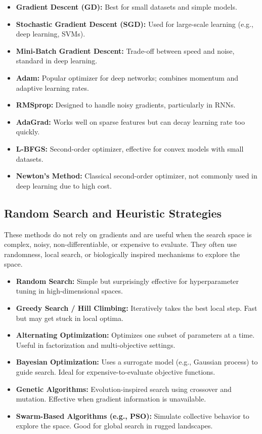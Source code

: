 \documentclass[12pt,openany]{book}
\begin{document}
\begin{itemize}
    \item \textbf{Gradient Descent (GD):} Best for small datasets and simple models.
    \item \textbf{Stochastic Gradient Descent (SGD):} Used for large-scale learning (e.g., deep learning, SVMs).
    \item \textbf{Mini-Batch Gradient Descent:} Trade-off between speed and noise, standard in deep learning.
    \item \textbf{Adam:} Popular optimizer for deep networks; combines momentum and adaptive learning rates.
    \item \textbf{RMSprop:} Designed to handle noisy gradients, particularly in RNNs.
    \item \textbf{AdaGrad:} Works well on sparse features but can decay learning rate too quickly.
    \item \textbf{L-BFGS:} Second-order optimizer, effective for convex models with small datasets.
    \item \textbf{Newton’s Method:} Classical second-order optimizer, not commonly used in deep learning due to high cost.
\end{itemize}

\subsection{Random Search and Heuristic Strategies}

These methods do not rely on gradients and are useful when the search space is complex, noisy, non-differentiable, or expensive to evaluate. They often use randomness, local search, or biologically inspired mechanisms to explore the space.

\begin{itemize}
    \item \textbf{Random Search:} Simple but surprisingly effective for hyperparameter tuning in high-dimensional spaces.
    \item \textbf{Greedy Search / Hill Climbing:} Iteratively takes the best local step. Fast but may get stuck in local optima.
    \item \textbf{Alternating Optimization:} Optimizes one subset of parameters at a time. Useful in factorization and multi-objective settings.
    \item \textbf{Bayesian Optimization:} Uses a surrogate model (e.g., Gaussian process) to guide search. Ideal for expensive-to-evaluate objective functions.
    \item \textbf{Genetic Algorithms:} Evolution-inspired search using crossover and mutation. Effective when gradient information is unavailable.
    \item \textbf{Swarm-Based Algorithms (e.g., PSO):} Simulate collective behavior to explore the space. Good for global search in rugged landscapes.
\end{itemize}
\end{document}
